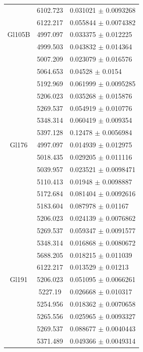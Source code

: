 \begin{longtable}{|c|c|l|}
 & 6102.723 & 0.031021 $\pm$ 0.0093268 \\       
 & 6122.217 & 0.055844 $\pm$ 0.0074382 \\       
\hline                                          
Gl105B & 4997.097 & 0.033375 $\pm$ 0.012225 \\  
 & 4999.503 & 0.043832 $\pm$ 0.014364 \\        
 & 5007.209 & 0.023079 $\pm$ 0.016576 \\        
 & 5064.653 & 0.04528 $\pm$ 0.0154 \\           
 & 5192.969 & 0.061999 $\pm$ 0.0095285 \\       
 & 5206.023 & 0.035268 $\pm$ 0.015876 \\        
 & 5269.537 & 0.054919 $\pm$ 0.010776 \\        
 & 5348.314 & 0.060419 $\pm$ 0.009354 \\        
 & 5397.128 & 0.12478 $\pm$ 0.0056984 \\        
\hline                                          
Gl176 & 4997.097 & 0.014939 $\pm$ 0.012975 \\   
 & 5018.435 & 0.029205 $\pm$ 0.011116 \\        
 & 5039.957 & 0.023521 $\pm$ 0.0098471 \\       
 & 5110.413 & 0.01948 $\pm$ 0.0098887 \\        
 & 5172.684 & 0.081404 $\pm$ 0.0092616 \\       
 & 5183.604 & 0.087978 $\pm$ 0.01167 \\         
 & 5206.023 & 0.024139 $\pm$ 0.0076862 \\       
 & 5269.537 & 0.059347 $\pm$ 0.0091577 \\       
 & 5348.314 & 0.016868 $\pm$ 0.0080672 \\       
 & 5688.205 & 0.018215 $\pm$ 0.011039 \\        
 & 6122.217 & 0.013529 $\pm$ 0.01213 \\         
\hline                                          
Gl191 & 5206.023 & 0.051095 $\pm$ 0.0066261 \\  
 & 5227.19 & 0.026668 $\pm$ 0.010317 \\         
 & 5254.956 & 0.018362 $\pm$ 0.0070658 \\       
 & 5265.556 & 0.025965 $\pm$ 0.0093327 \\       
 & 5269.537 & 0.088677 $\pm$ 0.0040443 \\       
 & 5371.489 & 0.049366 $\pm$ 0.0049314 \\       

\end{longtable}

